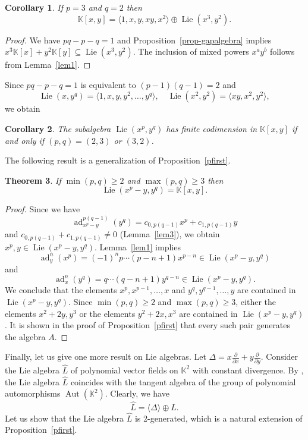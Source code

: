 \documentclass[a4paper,draft,reqno,12pt]{amsart}
\newtheorem{theorem}{Theorem}
\newtheorem{corollary}[theorem]{Corollary}
\theoremstyle{definition}
\theoremstyle{remark}
\DeclareMathOperator{\lie}{Lie}
\DeclareMathOperator{\adj}{ad}
\DeclareMathOperator{\Aut}{Aut}
\def\KK{{\mathbb K}}
\begin{document}
\begin{corollary}
If $p = 3$ and $q = 2$ then
$$
\KK[x,y] = \langle 1, x, y, xy, x^2 \rangle\oplus \lie(x^3, y^2). 
$$
\end{corollary}

\begin{proof}
We have $pq - p - q = 1$ and Proposition~\ref{prop-gapalgebra} implies $x^3 \KK[x] + y^2 \KK[y] \subseteq\lie(x^3, y^2)$. 
The inclusion of mixed powers $x^ay^b$ follows from Lemma~\ref{lem1}.
\end{proof}

Since $pq-p-q=1$ is equivalent to $(p-1)(q-1)=2$ and
$$
\lie(x,y^q)=\langle 1,x,y,y^2,\ldots,y^q\rangle, \quad \lie(x^2, y^2) = \langle xy, x^2,y^2 \rangle, 
$$
we obtain

\begin{corollary}
The subalgebra $\lie(x^p,y^q)$ has finite codimension in $\KK[x,y]$ if and only if $(p,q) = (2,3)$ or $(3,2)$.  
\end{corollary}

The following result is a generalization of Proposition~\ref{pfirst}. 

\begin{theorem} \label{fullalgebra}
If $\min(p,q) \geq 2$ and $\max(p,q) \geq 3$ then
$$
\lie(x^p - y, y^q) = \KK[x,y].
$$
\end{theorem}

\begin{proof}
Since we have
\[
\adj_{x^p - y}^{p(q-1)}(y^q) = c_{0,p(q-1)} x^{p} + c_{1,p(q-1)} y
\]
and $c_{0,p(q-1)} + c_{1,p(q-1)}\ne 0$ (Lemma~\ref{lem3}), we obtain $x^p, y \in \lie(x^p - y, y^q)$. 
Lemma~\ref{lem1} implies
$$
\adj_{y}^n(x^p) = (-1)^n p \cdots (p-n+1) x^{p-n} \in \lie(x^p - y, y^q) 
$$
and
$$
\adj_{x}^n(y^q) = q \cdots (q-n+1) y^{q-n} \in \lie(x^p - y, y^q). 
$$
We conclude that the elements $x^p, x^{p-1},\ldots, x$ and $y^q, y^{q-1},\ldots, y$ are contained in ${\lie(x^p -  y, y^q)}$. 
Since $\min(p,q) \geq 2$ and $\max(p,q) \geq 3$, either the elements $x^2+2y, y^3$ or the elements $y^2+2x, x^3$ are contained in  
$\lie(x^p - y, y^q)$.  It is shown in the proof of Proposition~\ref{pfirst} that every such pair generates the algebra $A$. 
\end{proof}

Finally, let us give one more result on Lie algebras. Let $\Delta=x\frac{\partial}{\partial x} + y\frac{\partial}{\partial y}$. Consider the Lie algebra $\widehat{L}$ 
of polynomial vector fields on $\KK^2$ with constant divergence.  By \cite[Proposition~15.7.2]{FK}, the Lie algebra $\widehat{L}$  coincides with the tangent
algebra of the group of polynomial automorphisms $\Aut(\KK^2)$. Clearly, we have
$$
\widehat{L} = \langle \Delta \rangle \oplus L. 
$$
Let us show that the Lie algebra $\widehat{L}$ is 2-generated, which is a natural extension of Proposition~\ref{pfirst}. 
\end{document}
